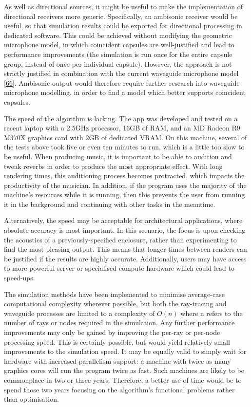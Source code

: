 \documentclass[]{scrreprt}
\begin{document}
As well as directional sources, it might be useful to make the
implementation of directional receivers more generic. Specifically, an
ambisonic receiver would be useful, so that simulation results could be
exported for directional processing in dedicated software. This could be
achieved without modifying the geometric microphone model, in which
coincident capsules are well-justified and lead to performance
improvements (the simulation is run once for the entire capsule group,
instead of once per individual capsule). However, the approach is not
strictly justified in combination with the current waveguide microphone
model
{[}\protect\hyperlink{ref-hacihabibogluux5fsimulationux5f2010}{66}{]}.
Ambisonic output would therefore require further research into waveguide
microphone modelling, in order to find a model which better supports
coincident capsules.

The speed of the algorithm is lacking. The app was developed and tested
on a recent laptop with a 2.5GHz processor, 16GB of RAM, and an MD
Radeon R9 M370X graphics card with 2GB of dedicated VRAM. On this
machine, several of the tests above took five or even ten minutes to
run, which is a little too slow to be useful. When producing music, it
is important to be able to audition and tweak reverbs in order to
produce the most appropriate effect. With long rendering times, this
auditioning process becomes protracted, which impacts the productivity
of the musician. In addition, if the program uses the majority of the
machine's resources while it is running, then this prevents the user
from running it in the background and continuing with other tasks in the
meantime.

Alternatively, the speed may be acceptable for architectural
applications, where absolute accuracy is most important. In this
scenario, the focus is upon checking the acoustics of a
previously-specified enclosure, rather than experimenting to find the
most pleasing output. This means that longer times between renders can
be justified if the results are highly accurate. Additionally, users may
have access to more powerful server or specialised compute hardware
which could lead to speed-ups.

The simulation methods have been implemented to minimise average-case
computational complexity wherever possible, but both the ray-tracing and
waveguide processes are limited to a complexity of \(O(n)\) where n
refers to the number of rays or nodes required in the simulation. Any
further performance improvements may only be gained by improving the
per-ray or per-node processing speed. This is certainly possible, but
would yield relatively small improvements to the simulation speed. It
may be equally valid to simply wait for hardware with increased
parallelism support: a machine with twice as many graphics cores will
run the program twice as fast. Such machines are likely to be
commonplace in two or three years. Therefore, a better use of time would
be to spend those two years focusing on the algorithm's functional
problems rather than optimisation.
\end{document}
